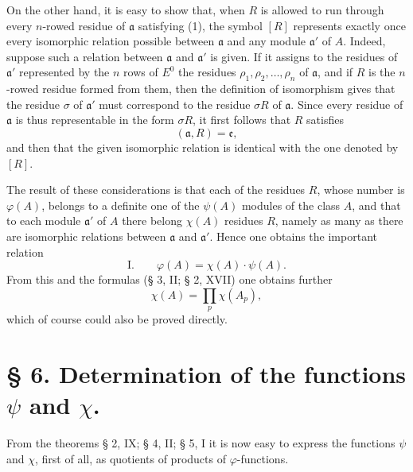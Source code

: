 \documentclass[11pt,a4paper]{article}
\begin{document}
On the other hand, it is easy to show that, when $R$ is allowed to run through every $n$-rowed residue of $\mathfrak a$ satisfying (1), the symbol $[R]$ represents exactly once every isomorphic relation possible between $\mathfrak a$ and any module $\mathfrak a'$ of $A$. Indeed, suppose such a relation between $\mathfrak a$ and $\mathfrak a'$ is given. If it assigns to the residues of $\mathfrak a'$ represented by the $n$ rows of $E^0$ the residues $\rho_1,\rho_2,\ldots,\rho_n$ of $\mathfrak a$, and if $R$ is the $n$-rowed residue formed from them, then the definition of isomorphism gives that the residue $\sigma$ of $\mathfrak a'$ must correspond to the residue $\sigma R$ of $\mathfrak a$. Since every residue of $\mathfrak a$ is thus representable in the form $\sigma R$, it first follows that $R$ satisfies
\[
 (\mathfrak a,R)=\mathfrak e,
\]
and then that the given isomorphic relation is identical with the one denoted by $[R]$.

The result of these considerations is that each of the residues $R$, whose number is $\varphi(A)$, belongs to a definite one of the $\psi(A)$ modules of the class $A$, and that to each module $\mathfrak a'$ of $A$ there belong $\chi(A)$ residues $R$, namely as many as there are isomorphic relations between $\mathfrak a$ and $\mathfrak a'$. Hence one obtains the important relation
\[
\text{I.}\qquad \varphi(A)=\chi(A)\cdot\psi(A).
\]
From this and the formulas (§ 3, II; § 2, XVII) one obtains further
\[
 \chi(A)=\prod_p \chi(A_p),
\]
which of course could also be proved directly.

\section*{§ 6. Determination of the functions $\psi$ and $\chi$.}

From the theorems § 2, IX; § 4, II; § 5, I it is now easy to express the functions $\psi$ and $\chi$, first of all, as quotients of products of $\varphi$-functions.
\end{document}
